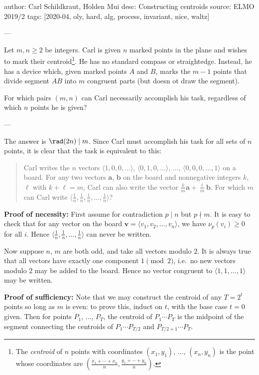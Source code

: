 author: Carl Schildkraut, Holden Mui
desc: Constructing centroids
source: ELMO 2019/2
tags: [2020-04, oly, hard, alg, process, invariant, nice, waltz]

---

Let $m,n\ge2$ be integers. Carl is given $n$ marked points in the plane and wishes to mark their centroid\footnote{The \emph{centroid} of $n$ points with coordinates $(x_1,y_1)$, $\ldots$, $(x_n,y_n)$ is the point whose coordinates are $(\tfrac{x_1+\cdots+x_n}n,\tfrac{y_1+\cdots+y_n}n)$.}. He has no standard compass or straightedge. Instead, he has a device which, given marked points $A$ and $B$, marks the $m-1$ points that divide segment $AB$ into $m$ congruent parts (but doesn ot draw the segment).

For which pairs $(m,n)$ can Carl necessarily accomplish his task, regardless of which $n$ points he is given?

---

The answer is $\rad(2n)\mid m$. Since Carl must accomplish his task for all sets of $n$ points, it is clear that the task is equivalent to this:
\begin{quote}
    Carl writes the $n$ vectors $\langle1,0,0,\ldots\rangle$, $\langle0,1,0,\ldots\rangle$, $\ldots$, $\langle0,0,0,\ldots,1\rangle$ on a board. For any two vectors $\mathbf a$, $\mathbf b$ on the board and nonnegative integers $k$, $\ell$ with $k+\ell=m$, Carl can also write the vector $\tfrac km\mathbf a+\tfrac\ell m\mathbf b$. For which $m$ can Carl write $\langle\tfrac1n,\tfrac1n,\tfrac1n,\ldots,\tfrac1n\rangle$?
\end{quote}

\bigskip

\textbf{Proof of necessity:} First assume for contradiction $p\mid n$ but $p\nmid m$. It is easy to check that for any vector on the board $\mathbf v=\langle v_1,v_2,\ldots,v_n\rangle$, we have $\nu_p(v_i)\ge0$ for all $i$. Hence $\langle\tfrac1n,\tfrac1n,\ldots,\tfrac1n\rangle$ can never be written.

Now suppose $n$, $m$ are both odd, and take all vectors modulo $2$. It is always true that all vectors have exactly one component $1\pmod2$, i.e.\ no new vectors modulo $2$ may be added to the board. Hence no vector congruent to $\langle1,1,\ldots,1\rangle$ may be written.

\bigskip

\textbf{Proof of sufficiency:} Note that we may construct the centroid of any $T=2^t$ points so long as $m$ is even: to prove this, induct on $t$, with the base case $t=0$ given. Then for points $P_1$, $\ldots$, $P_T$, the centroid of $P_1\cdots P_T$ is the midpoint of the segment connecting the centroids of $P_1\cdots P_{T/2}$ and $P_{T/2+1}\cdots P_T$.

